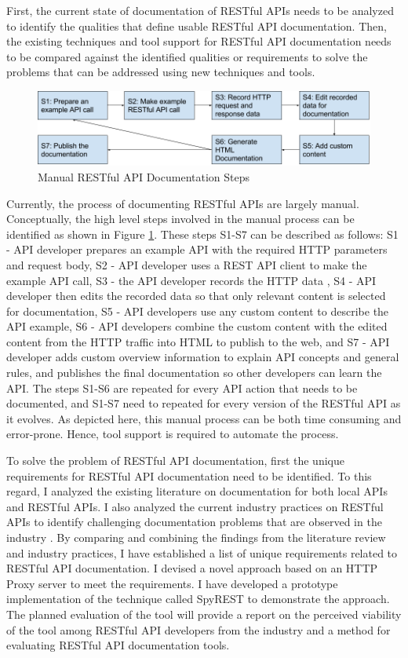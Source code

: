 \documentclass[11pt,oneside]{book}
\begin{document}
First, the current state of documentation of RESTful APIs needs to be analyzed to identify the qualities that define usable RESTful API documentation. Then, the existing techniques and tool support for RESTful API documentation needs to be compared against the identified qualities or requirements to solve the problems that can be addressed using new techniques and tools.

\begin{figure}[htb]
  \includegraphics[width=\linewidth]{manual_workflow.png}
  \caption{Manual RESTful API Documentation Steps}
  \label{fig:manual}
\end{figure}

Currently, the process of documenting RESTful APIs are largely manual. Conceptually, the high level steps involved in the manual process can be identified as shown in Figure \ref{fig:manual}. These steps S1-S7 can be described as follows: S1 - API developer prepares an example API with the required HTTP parameters and request body, S2 - API developer uses a REST API client to make the example API call, S3 - the API developer records the HTTP data , S4 - API developer then edits the recorded data so that only relevant content is selected for documentation, S5 - API developers use any custom content to describe the API example, S6 - API developers combine the custom content with the edited content from the HTTP traffic into HTML to publish to the web, and S7 - API developer adds custom overview information to explain API concepts and general rules, and publishes the final documentation so other developers can learn the API. The steps S1-S6 are repeated for every API action that needs to be documented, and S1-S7 need to repeated for every version of the RESTful API as it evolves. As depicted here, this manual process can be both time consuming and error-prone. Hence, tool support is required to automate the process.

To solve the problem of RESTful API documentation, first the unique requirements for RESTful API documentation need to be identified. To this regard, I analyzed the existing literature on documentation for both local APIs and RESTful APIs. I also analyzed the current industry practices on RESTful APIs to identify challenging documentation problems that are observed in the industry \cite{sohan2015case}. By comparing and combining the findings from the literature review and industry practices, I have established a list of unique requirements related to RESTful API documentation. I devised a novel approach based on an HTTP Proxy server to meet the requirements. I have developed a  prototype implementation of the technique called SpyREST to demonstrate the approach. The planned evaluation of the tool will provide a report on the perceived viability of the tool among RESTful API developers from the industry and a method for evaluating RESTful API documentation tools.
\end{document}
